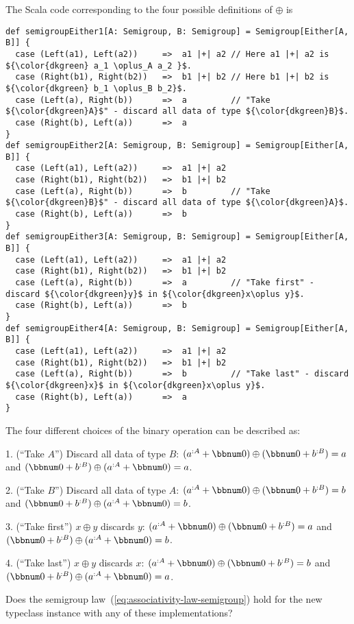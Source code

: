 The Scala code corresponding to the four possible definitions of $\oplus$
is
\begin{lstlisting}[mathescape=true]
def semigroupEither1[A: Semigroup, B: Semigroup] = Semigroup[Either[A, B]] {
  case (Left(a1), Left(a2))     =>  a1 |+| a2 // Here a1 |+| a2 is ${\color{dkgreen} a_1 \oplus_A a_2 }$.
  case (Right(b1), Right(b2))   =>  b1 |+| b2 // Here b1 |+| b2 is ${\color{dkgreen} b_1 \oplus_B b_2}$.
  case (Left(a), Right(b))      =>  a         // "Take ${\color{dkgreen}A}$" - discard all data of type ${\color{dkgreen}B}$.
  case (Right(b), Left(a))      =>  a
}
def semigroupEither2[A: Semigroup, B: Semigroup] = Semigroup[Either[A, B]] {
  case (Left(a1), Left(a2))     =>  a1 |+| a2
  case (Right(b1), Right(b2))   =>  b1 |+| b2
  case (Left(a), Right(b))      =>  b         // "Take ${\color{dkgreen}B}$" - discard all data of type ${\color{dkgreen}A}$.
  case (Right(b), Left(a))      =>  b
}
def semigroupEither3[A: Semigroup, B: Semigroup] = Semigroup[Either[A, B]] {
  case (Left(a1), Left(a2))     =>  a1 |+| a2
  case (Right(b1), Right(b2))   =>  b1 |+| b2
  case (Left(a), Right(b))      =>  a         // "Take first" - discard ${\color{dkgreen}y}$ in ${\color{dkgreen}x\oplus y}$.
  case (Right(b), Left(a))      =>  b
}
def semigroupEither4[A: Semigroup, B: Semigroup] = Semigroup[Either[A, B]] {
  case (Left(a1), Left(a2))     =>  a1 |+| a2
  case (Right(b1), Right(b2))   =>  b1 |+| b2
  case (Left(a), Right(b))      =>  b         // "Take last" - discard ${\color{dkgreen}x}$ in ${\color{dkgreen}x\oplus y}$.
  case (Right(b), Left(a))      =>  a
}
\end{lstlisting}
The four different choices of the binary operation can be described
as:

1. (``Take $A$'') Discard all data of type $B$: $(a^{:A}+\bbnum 0)\oplus(\bbnum 0+b^{:B})=a$
and $(\bbnum 0+b^{:B})\oplus(a^{:A}+\bbnum 0)=a$.

2. (``Take $B$'') Discard all data of type $A$: $(a^{:A}+\bbnum 0)\oplus(\bbnum 0+b^{:B})=b$
and $(\bbnum 0+b^{:B})\oplus(a^{:A}+\bbnum 0)=b$.

3. (``Take first'') $x\oplus y$ discards $y$: $(a^{:A}+\bbnum 0)\oplus(\bbnum 0+b^{:B})=a$
and $(\bbnum 0+b^{:B})\oplus(a^{:A}+\bbnum 0)=b$.

4. (``Take last'') $x\oplus y$ discards $x$: $(a^{:A}+\bbnum 0)\oplus(\bbnum 0+b^{:B})=b$
and $(\bbnum 0+b^{:B})\oplus(a^{:A}+\bbnum 0)=a$.

\noindent Does the semigroup law~(\ref{eq:associativity-law-semigroup})
hold for the new typeclass instance with any of these implementations?

